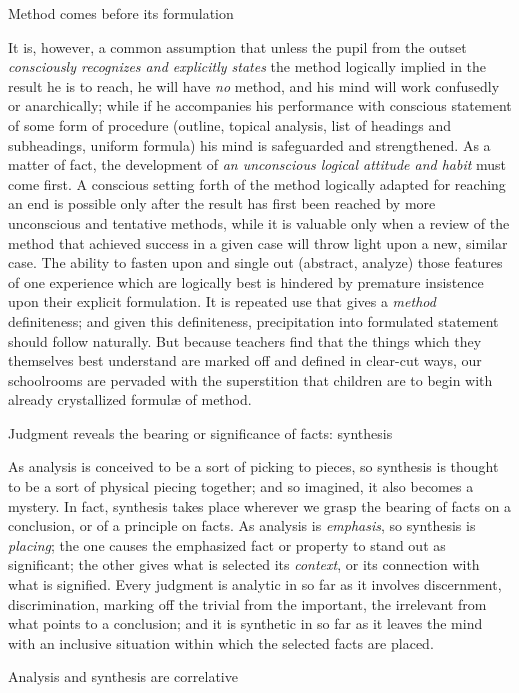 \documentclass[letterpaper]{book}
\begin{document}
Method comes before its formulation

It is, however, a common assumption that unless the pupil from the
outset \emph{consciously recognizes and explicitly states} the method
logically implied in the result he is to reach, he will have \emph{no}
method, and his mind will work confusedly or anarchically; while if he
accompanies his performance with conscious statement of some form of
procedure (outline, topical analysis, list of headings and subheadings,
uniform formula) his mind is safeguarded and strengthened. As a matter
of fact, the development of \emph{an unconscious logical attitude and
habit} must come first. A conscious setting forth of the method
logically adapted for reaching an end is possible only after the result
has first been reached by more unconscious and tentative methods, while
it is valuable only when a review of the method that achieved success in
a given case will throw light upon a new, similar case. The ability to
fasten upon and single out (abstract, analyze) those features of one
experience which are logically best is hindered by premature insistence
upon their explicit formulation. It is repeated use that gives a
\emph{method} definiteness; and given this definiteness, precipitation
into formulated statement should follow naturally. But because teachers
find that the things which they themselves best understand are marked
off and defined in clear-cut ways, our schoolrooms are
pervaded
with the superstition that children are to begin with already
crystallized formulæ of method.

Judgment reveals the bearing or significance of facts: synthesis

As analysis is conceived to be a sort of picking to pieces, so synthesis
is thought to be a sort of physical piecing together; and so imagined,
it also becomes a mystery. In fact, synthesis takes place wherever we
grasp the bearing of facts on a conclusion, or of a principle on facts.
As analysis is \emph{emphasis}, so synthesis is \emph{placing}; the one
causes the emphasized fact or property to stand out as significant; the
other gives what is selected its \emph{context}, or its connection with
what is signified. Every judgment is analytic in so far as it involves
discernment, discrimination, marking off the trivial from the important,
the irrelevant from what points to a conclusion; and it is synthetic in
so far as it leaves the mind with an inclusive situation within which
the selected facts are placed.

Analysis and synthesis are correlative
\end{document}
